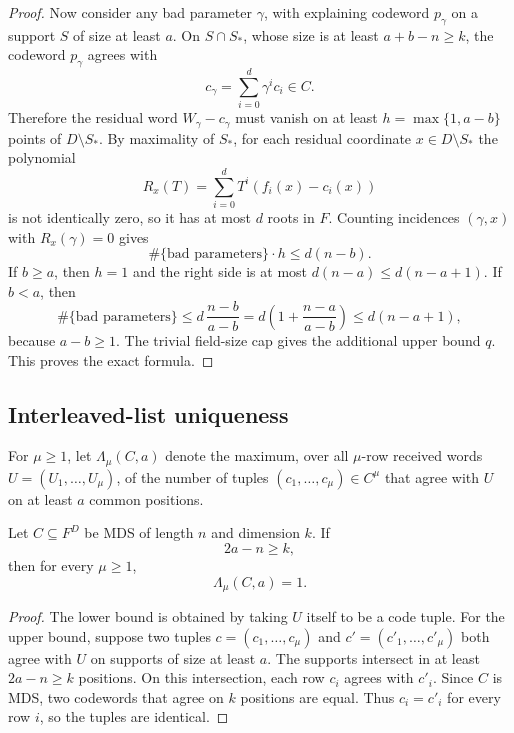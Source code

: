 \begin{proof}
Now consider any bad parameter \(\gamma\), with explaining codeword \(p_\gamma\)
on a support \(S\) of size at least \(a\).  On \(S\cap S_*\), whose size is at
least \(a+b-n\ge k\), the codeword \(p_\gamma\) agrees with
\[
  c_\gamma=\sum_{i=0}^d\gamma^i c_i\in C.
\]
Therefore the residual word \(W_\gamma-c_\gamma\) must vanish on at least
\(h=\max\{1,a-b\}\) points of \(D\setminus S_*\).  By maximality of \(S_*\), for
each residual coordinate \(x\in D\setminus S_*\) the polynomial
\[
  R_x(T)=\sum_{i=0}^d T^i(f_i(x)-c_i(x))
\]
is not identically zero, so it has at most \(d\) roots in \(F\).  Counting
incidences \((\gamma,x)\) with \(R_x(\gamma)=0\) gives
\[
  \#\{\text{bad parameters}\}\cdot h
  \le d(n-b).
\]
If \(b\ge a\), then \(h=1\) and the right side is at most
\(d(n-a)\le d(n-a+1)\).  If \(b<a\), then
\[
  \#\{\text{bad parameters}\}
  \le
  d\,\frac{n-b}{a-b}
  =
  d\left(1+\frac{n-a}{a-b}\right)
  \le d(n-a+1),
\]
because \(a-b\ge1\).  The trivial field-size cap gives the additional upper
bound \(q\).  This proves the exact formula.
\end{proof}

\subsection{Interleaved-list uniqueness}

For \(\mu\ge1\), let \(\Lambda_\mu(C,a)\) denote the maximum, over all
\(\mu\)-row received words \(U=(U_1,\ldots,U_\mu)\), of the number of tuples
\((c_1,\ldots,c_\mu)\in C^\mu\) that agree with \(U\) on at least \(a\) common
positions.

\begin{theorem}
\label{thm:interleaved-unique-high-agreement}
Let \(C\subseteq F^D\) be MDS of length \(n\) and dimension \(k\).  If
\[
  2a-n\ge k,
\]
then for every \(\mu\ge1\),
\[
  \Lambda_\mu(C,a)=1 .
\]
\end{theorem}

\begin{proof}
The lower bound is obtained by taking \(U\) itself to be a code tuple.  For the
upper bound, suppose two tuples \(c=(c_1,\ldots,c_\mu)\) and
\(c'=(c'_1,\ldots,c'_\mu)\) both agree with \(U\) on supports of size at least
\(a\).  The supports intersect in at least \(2a-n\ge k\) positions.  On this
intersection, each row \(c_i\) agrees with \(c'_i\).  Since \(C\) is MDS, two
codewords that agree on \(k\) positions are equal.  Thus \(c_i=c'_i\) for every
row \(i\), so the tuples are identical.
\end{proof}

